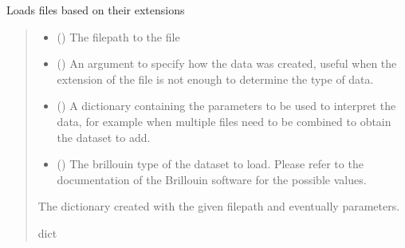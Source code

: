 \documentclass[letterpaper,10pt,english]{sphinxmanual}
\begin{document}

\begin{fulllineitems}
\label{\detokenize{_autosummary/HDF5_BLS.load_data:HDF5_BLS.load_data.load_general}}
\pysigstartsignatures
\pysiglinewithargsret
{}
{\sphinxparamcomma {}\sphinxparamcomma {}\sphinxparamcomma {}}
{}
\pysigstopsignatures
\sphinxAtStartPar
Loads files based on their extensions
\begin{quote}\begin{description}
\begin{itemize}
\item {} 
\sphinxAtStartPar
{} () \textendash{} The filepath to the file

\item {} 
\sphinxAtStartPar
{} () \textendash{} An argument to specify how the data was created, useful when the extension of the file is not enough to determine the type of data.

\item {} 
\sphinxAtStartPar
{} () \textendash{} A dictionary containing the parameters to be used to interpret the data, for example when multiple files need to be combined to obtain the dataset to add.

\item {} 
\sphinxAtStartPar
{} () \textendash{} The brillouin type of the dataset to load. Please refer to the documentation of the Brillouin software for the possible values.

\end{itemize}

\sphinxAtStartPar
The dictionary created with the given filepath and eventually parameters.

\sphinxAtStartPar
dict

\end{description}\end{quote}

\end{fulllineitems}
\end{document}
